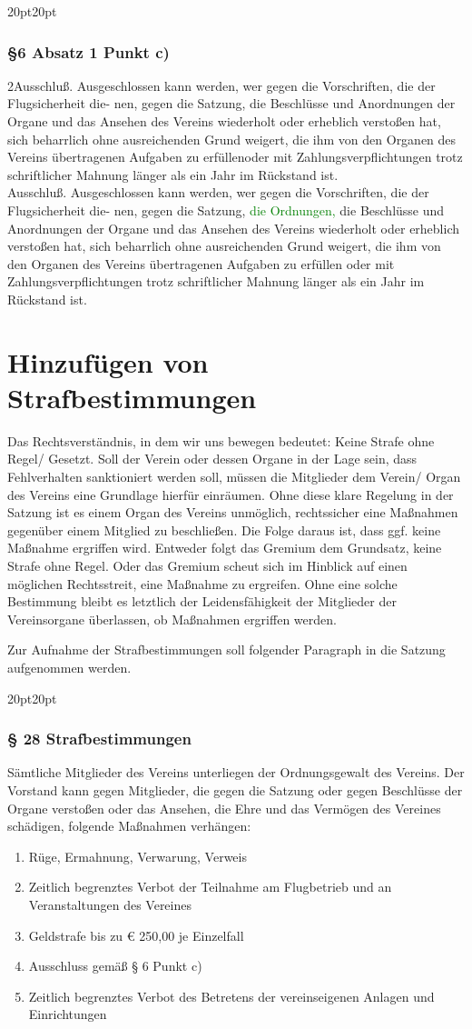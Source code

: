 \documentclass[10pt,a4paper,parskip=half]{scrartcl}
\newcommand{\new}[1]{\textcolor{Green}{#1}}
\newcommand{\change}[1]{
  \begin{adjustwidth}{20pt}{20pt}
    #1
  \end{adjustwidth}
}
\newcommand{\compare}[3]{\change{\subsubsection*{#1}\begin{multicols}{2}#2\columnbreak\\#3\end{multicols}}}
\begin{document}
\compare{§6 Absatz 1 Punkt c)}
{Ausschluß. Ausgeschlossen kann werden, wer gegen die Vorschriften, die der Flugsicherheit die-
  nen, gegen die Satzung, die Beschlüsse und Anordnungen der Organe und das Ansehen des Vereins wiederholt oder erheblich verstoßen hat, sich beharrlich ohne ausreichenden Grund weigert, die ihm von den Organen des Vereins übertragenen Aufgaben zu erfüllenoder mit
  Zahlungsverpflichtungen trotz schriftlicher Mahnung länger als ein Jahr im Rückstand ist.}
{Ausschluß. Ausgeschlossen kann werden, wer gegen die Vorschriften, die der Flugsicherheit die-
  nen, gegen die Satzung, \new{die Ordnungen,} die Beschlüsse und Anordnungen der Organe und das
  Ansehen des Vereins wiederholt oder erheblich verstoßen hat, sich beharrlich ohne ausreichenden
  Grund weigert, die ihm von den Organen des Vereins übertragenen Aufgaben zu erfüllen oder mit
  Zahlungsverpflichtungen trotz schriftlicher Mahnung länger als ein Jahr im Rückstand ist.}

\clearpage
\section{Hinzufügen von Strafbestimmungen}
Das Rechtsverständnis, in dem wir uns bewegen bedeutet: Keine Strafe ohne Regel/ Gesetzt. Soll der Verein oder dessen Organe in der Lage sein, dass Fehlverhalten sanktioniert werden soll, müssen die Mitglieder dem Verein/ Organ des Vereins eine Grundlage hierfür einräumen. Ohne diese klare Regelung in der Satzung ist es einem Organ des Vereins unmöglich, rechtssicher eine Maßnahmen gegenüber einem Mitglied zu beschließen. Die Folge daraus ist, dass ggf. keine Maßnahme ergriffen wird. Entweder folgt das Gremium dem Grundsatz, keine Strafe ohne Regel. Oder das Gremium scheut sich im Hinblick auf einen möglichen Rechtsstreit, eine Maßnahme zu ergreifen. Ohne eine solche Bestimmung bleibt es letztlich der Leidensfähigkeit der Mitglieder der Vereinsorgane überlassen, ob Maßnahmen ergriffen werden.

Zur Aufnahme der Strafbestimmungen soll folgender Paragraph in die Satzung aufgenommen werden.

\change{
  \subsubsection*{§ 28 Strafbestimmungen}
  Sämtliche Mitglieder des Vereins unterliegen der Ordnungsgewalt des Vereins.
  Der Vorstand kann gegen Mitglieder,
  die gegen die Satzung oder gegen Beschlüsse der Organe verstoßen oder das Ansehen,
  die Ehre und das Vermögen des Vereines schädigen,
  folgende Maßnahmen verhängen:
  \begin{enumerate}[label=\alph*),noitemsep]
    \item Rüge, Ermahnung, Verwarung, Verweis
    \item Zeitlich begrenztes Verbot der Teilnahme am Flugbetrieb und an Veranstaltungen des Vereines
    \item Geldstrafe bis zu € 250,00 je Einzelfall
    \item Ausschluss gemäß § 6 Punkt c)
    \item Zeitlich begrenztes Verbot des Betretens der vereinseigenen Anlagen und Einrichtungen
  \end{enumerate}
}
\clearpage
\end{document}
